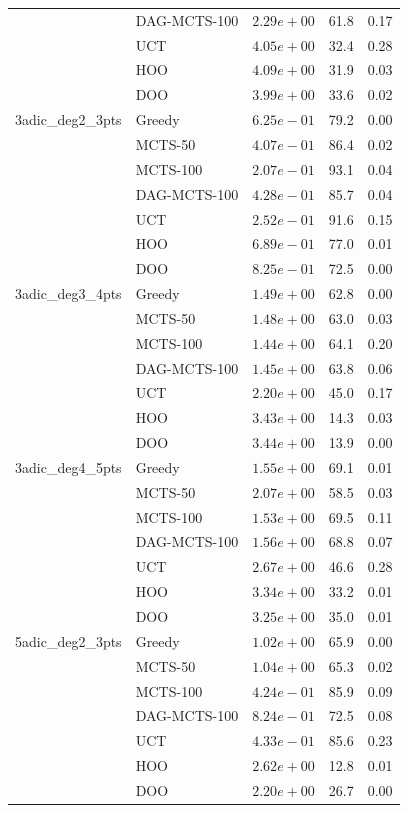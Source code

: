 \begin{table}[ht]
\begin{tabular}{llrrr}
 & DAG-MCTS-100 & $2.29e+00$ & 61.8 & 0.17 \\
 & UCT & $4.05e+00$ & 32.4 & 0.28 \\
 & HOO & $4.09e+00$ & 31.9 & 0.03 \\
 & DOO & $3.99e+00$ & 33.6 & 0.02 \\
\midrule
3adic\_deg2\_3pts & Greedy & $6.25e-01$ & 79.2 & 0.00 \\
 & MCTS-50 & $4.07e-01$ & 86.4 & 0.02 \\
 & MCTS-100 & $2.07e-01$ & 93.1 & 0.04 \\
 & DAG-MCTS-100 & $4.28e-01$ & 85.7 & 0.04 \\
 & UCT & $2.52e-01$ & 91.6 & 0.15 \\
 & HOO & $6.89e-01$ & 77.0 & 0.01 \\
 & DOO & $8.25e-01$ & 72.5 & 0.00 \\
\midrule
3adic\_deg3\_4pts & Greedy & $1.49e+00$ & 62.8 & 0.00 \\
 & MCTS-50 & $1.48e+00$ & 63.0 & 0.03 \\
 & MCTS-100 & $1.44e+00$ & 64.1 & 0.20 \\
 & DAG-MCTS-100 & $1.45e+00$ & 63.8 & 0.06 \\
 & UCT & $2.20e+00$ & 45.0 & 0.17 \\
 & HOO & $3.43e+00$ & 14.3 & 0.03 \\
 & DOO & $3.44e+00$ & 13.9 & 0.00 \\
\midrule
3adic\_deg4\_5pts & Greedy & $1.55e+00$ & 69.1 & 0.01 \\
 & MCTS-50 & $2.07e+00$ & 58.5 & 0.03 \\
 & MCTS-100 & $1.53e+00$ & 69.5 & 0.11 \\
 & DAG-MCTS-100 & $1.56e+00$ & 68.8 & 0.07 \\
 & UCT & $2.67e+00$ & 46.6 & 0.28 \\
 & HOO & $3.34e+00$ & 33.2 & 0.01 \\
 & DOO & $3.25e+00$ & 35.0 & 0.01 \\
\midrule
5adic\_deg2\_3pts & Greedy & $1.02e+00$ & 65.9 & 0.00 \\
 & MCTS-50 & $1.04e+00$ & 65.3 & 0.02 \\
 & MCTS-100 & $4.24e-01$ & 85.9 & 0.09 \\
 & DAG-MCTS-100 & $8.24e-01$ & 72.5 & 0.08 \\
 & UCT & $4.33e-01$ & 85.6 & 0.23 \\
 & HOO & $2.62e+00$ & 12.8 & 0.01 \\
 & DOO & $2.20e+00$ & 26.7 & 0.00 \\

\end{tabular}
\end{table}
